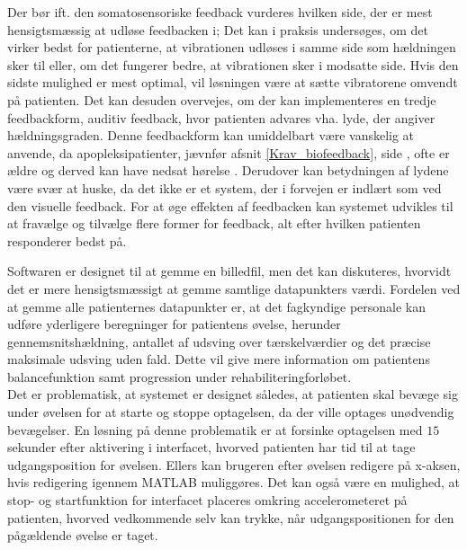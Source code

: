 Der bør ift. den somatosensoriske feedback vurderes hvilken side, der er mest hensigtsmæssig at udløse feedbacken i; Det kan i praksis undersøges, om det virker bedst for patienterne, at vibrationen udløses i samme side som hældningen sker til eller, om det fungerer bedre, at vibrationen sker i modsatte side. Hvis den sidste mulighed er mest optimal, vil løsningen være at sætte vibratorene omvendt på patienten. Det kan desuden overvejes, om der kan implementeres en tredje feedbackform, auditiv feedback, hvor patienten advares vha. lyde, der angiver hældningsgraden. Denne feedbackform kan umiddelbart være vanskelig at anvende, da apopleksipatienter, jævnfør afsnit \ref{Krav_biofeedback}, side \pageref{Krav_biofeedback}, ofte er ældre og derved kan have nedsat hørelse \cite{Sundhedsstyrelsen2011}. Derudover kan betydningen af lydene være svær at huske, da det ikke er et system, der i forvejen er indlært som ved den visuelle feedback. For at øge effekten af feedbacken kan systemet udvikles til at fravælge og tilvælge flere former for feedback, alt efter hvilken patienten responderer bedst på.

Softwaren er designet til at gemme en billedfil, men det kan diskuteres, hvorvidt det er mere hensigtsmæssigt at gemme samtlige datapunkters værdi. Fordelen ved at gemme alle patienternes datapunkter er, at det fagkyndige personale kan udføre yderligere beregninger for patientens øvelse, herunder gennemsnitshældning, antallet af udsving over tærskelværdier og det præcise maksimale udsving uden fald. Dette vil give mere information om patientens balancefunktion samt progression under rehabiliteringforløbet. \\
Det er problematisk, at systemet er designet således, at patienten skal bevæge sig under øvelsen for at starte og stoppe optagelsen, da der ville optages unødvendig bevægelser. En løsning på denne problematik er at forsinke optagelsen med $15$ sekunder efter aktivering i interfacet, hvorved patienten har tid til at tage udgangsposition for øvelsen. Ellers kan brugeren efter øvelsen redigere på x-aksen, hvis redigering igennem MATLAB muliggøres. Det kan også være en mulighed, at stop- og startfunktion for interfacet placeres omkring accelerometeret på patienten, hvorved vedkommende selv kan trykke, når udgangspositionen for den pågældende øvelse er taget.

